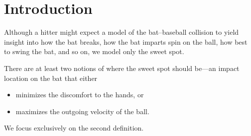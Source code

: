 
\section{Introduction}

Although a hitter might expect a model of the bat–baseball collision to
yield insight into how the bat breaks, how the bat imparts spin on the ball,
how best to swing the bat, and so on, we model only the sweet spot.

There are at least two notions of where the sweet spot should be—an
impact location on the bat that either
\begin{itemize}
\item minimizes the discomfort to the hands, or
\item maximizes the outgoing velocity of the ball.
\end{itemize}
We focus exclusively on the second definition.

